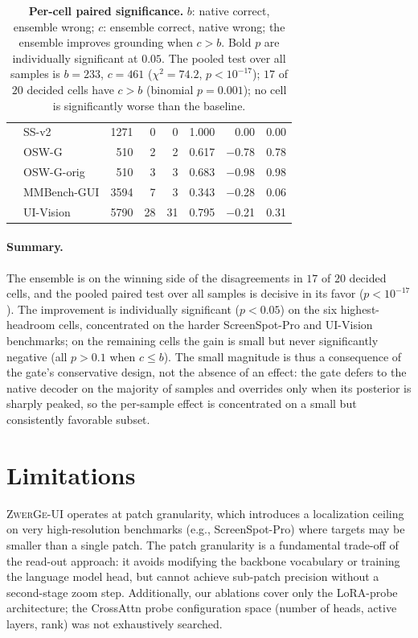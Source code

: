 \begin{table}[!htbp]
\begin{tabular}{ll r rr r rr}
 & SS-v2         & 1271 &  0 &  0 & 1.000 & 0.00 & 0.00 \\
 & OSW-G         &  510 &  2 &  2 & 0.617 & $-$0.78 & 0.78 \\
 & OSW-G-orig    &  510 &  3 &  3 & 0.683 & $-$0.98 & 0.98 \\
 & MMBench-GUI   & 3594 &  7 &  3 & 0.343 & $-$0.28 & 0.06 \\
 & UI-Vision     & 5790 & 28 & 31 & 0.795 & $-$0.21 & 0.31 \\
\bottomrule
\end{tabular}
\caption{\textbf{Per-cell paired significance.} $b$: native correct, ensemble wrong; $c$: ensemble correct, native wrong; the ensemble improves grounding when $c>b$. Bold $p$ are individually significant at $0.05$. The pooled test over all samples is $b=233$, $c=461$ ($\chi^2{=}74.2$, $p{<}10^{-17}$); $17$ of $20$ decided cells have $c>b$ (binomial $p{=}0.001$); no cell is significantly worse than the baseline.}
\label{tab:significance}
\end{table}

\paragraph{Summary.}
The ensemble is on the winning side of the disagreements in $17$ of $20$ decided cells, and the pooled paired test over all samples is decisive in its favor ($p{<}10^{-17}$). The improvement is individually significant ($p{<}0.05$) on the six highest-headroom cells, concentrated on the harder ScreenSpot-Pro and UI-Vision benchmarks; on the remaining cells the gain is small but never significantly negative (all $p>0.1$ when $c\le b$). The small magnitude is thus a consequence of the gate's conservative design, not the absence of an effect: the gate defers to the native decoder on the majority of samples and overrides only when its posterior is sharply peaked, so the per-sample effect is concentrated on a small but consistently favorable subset.

\section{Limitations}

\textsc{ZwerGe-UI} operates at patch granularity, which introduces a localization ceiling on very high-resolution benchmarks (e.g., ScreenSpot-Pro) where targets may be smaller than a single patch.
The patch granularity is a fundamental trade-off of the read-out approach: it avoids modifying the backbone vocabulary or training the language model head, but cannot achieve sub-patch precision without a second-stage zoom step.
Additionally, our ablations cover only the LoRA-probe architecture; the CrossAttn probe configuration space (number of heads, active layers, rank) was not exhaustively searched.

